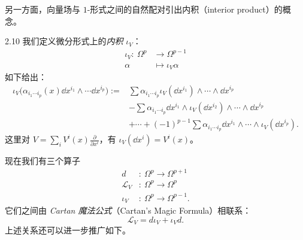 
另一方面，向量场与 $1$-形式之间的自然配对引出内积（interior product）的概念。

\begin{wdefn}{2.10}
  我们定义微分形式上的\emph{内积} $\iota_{V}$：
  \[
    \begin{aligned}
      \iota_{V}:\ \Omega^{p}&\to\Omega^{p-1}\\
      \alpha&\mapsto\iota_{V}\alpha
    \end{aligned}
  \]
  如下给出：
  \[
    \begin{aligned}
      \iota_{V}\big(\alpha_{i_{1}\cdots i_{p}}(x)\dd x^{i_{1}}\wedge\cdots
      \dd x^{i_{p}}\big)
      :={}&\sum\alpha_{i_{1}\cdots i_{p}}\iota_{V}(\dd x^{i_{1}})
      \wedge\cdots\wedge\dd x^{i_{p}}\\
      &-\sum\alpha_{i_{1}\cdots i_{p}}\dd x^{i_{1}}
      \wedge\iota_{V}(\dd x^{i_{2}})\wedge\cdots\wedge\dd x^{i_{p}}\\
      &+\cdots+(-1)^{p-1}\sum\alpha_{i_{1}\cdots i_{p}}\dd x^{i_{1}}
      \wedge\cdots\wedge\iota_{V}(\dd x^{i_{p}}).
    \end{aligned}
  \]
  这里对 $V=\sum_{i}V^{i}(x)\frac{\partial}{\partial x^{i}}$，有
  $\iota_{V}(\dd x^{i})=V^{i}(x)$。
\end{wdefn}


现在我们有三个算子
\[
  \begin{aligned}
    d&:\ \Omega^{p}\to\Omega^{p+1}\\
    \mathcal{L}_{V}&:\ \Omega^{p}\to\Omega^{p}\\
    \iota_{V}&:\ \Omega^{p}\to\Omega^{p-1}.
  \end{aligned}
\]
它们之间由 \emph{Cartan 魔法公式}（Cartan's Magic Formula）相联系：
\[
  \mathcal{L}_{V}=d\iota_{V}+\iota_{V}d.
\]
上述关系还可以进一步推广如下。

